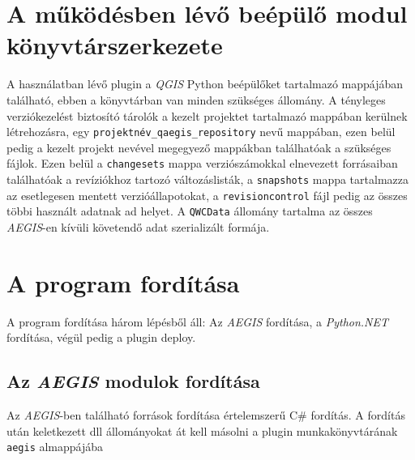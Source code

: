 \section{A működésben lévő beépülő modul könyvtárszerkezete}
A használatban lévő plugin a \emph{QGIS} Python beépülőket tartalmazó mappájában található, ebben a könyvtárban van minden szükséges állomány. A tényleges verziókezelést biztosító tárolók a kezelt projektet tartalmazó mappában kerülnek létrehozásra, egy \texttt{projektnév\_qaegis\_repository} nevű mappában, ezen belül pedig a kezelt projekt nevével megegyező mappákban találhatóak a szükséges fájlok. Ezen belül a \texttt{changesets} mappa verziószámokkal elnevezett forrásaiban találhatóak a revíziókhoz tartozó változáslisták, a \texttt{snapshots} mappa tartalmazza az esetlegesen mentett verzióállapotokat, a \texttt{revisioncontrol} fájl pedig az összes többi használt adatnak ad helyet. A \texttt{QWCData} állomány tartalma az összes \emph{AEGIS}-en kívüli követendő adat szerializált formája.

\section{A program fordítása}
A program fordítása három lépésből áll: Az \emph{AEGIS} fordítása, a \emph{Python.NET} fordítása, végül pedig a plugin deploy.
\subsection{Az \emph{AEGIS} modulok fordítása}
Az \emph{AEGIS}-ben található források fordítása értelemszerű C\# fordítás. A fordítás után keletkezett dll állományokat át kell másolni a plugin munkakönyvtárának \texttt{aegis} almappájába

